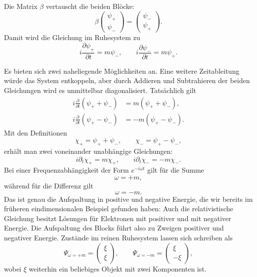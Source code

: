 Die Matrix \(\beta\) vertauscht die beiden Blöcke:
\begin{equation}
\beta
\begin{pmatrix}
\psi_+\\
\psi_-
\end{pmatrix}
=
\begin{pmatrix}
\psi_-\\
\psi_+
\end{pmatrix}.
\end{equation}
Damit wird die Gleichung im Ruhesystem zu
\begin{equation}
i\frac{\partial\psi_+}{\partial t}=m\psi_-,
\qquad
i\frac{\partial\psi_-}{\partial t}=m\psi_+.
\end{equation}

Es bieten sich zwei naheliegende Möglichkeiten an. Eine weitere Zeitableitung würde das System entkoppeln, aber durch Addieren und Subtrahieren der beiden Gleichungen wird es unmittelbar diagonalisiert. Tatsächlich gilt
\begin{align}
i\frac{\partial}{\partial t}(\psi_++\psi_-)
&=m(\psi_++\psi_-),\\
i\frac{\partial}{\partial t}(\psi_+-\psi_-)
&=-m(\psi_+-\psi_-).
\end{align}
Mit den Definitionen
\begin{equation}
\chi_+=\psi_++\psi_-,
\qquad
\chi_-=\psi_+-\psi_-,
\end{equation}
erhält man zwei voneinander unabhängige Gleichungen:
\begin{equation}
i\partial_t\chi_+=m\chi_+,
\qquad
i\partial_t\chi_-=-m\chi_-.
\end{equation}
Bei einer Frequenzabhängigkeit der Form \(e^{-i\omega t}\) gilt für die Summe
\begin{equation}
\omega=+m,
\end{equation}
während für die Differenz gilt
\begin{equation}
\omega=-m.
\end{equation}
Das ist genau die Aufspaltung in positive und negative Energie, die wir bereits im früheren eindimensionalen Beispiel gefunden haben: Auch die relativistische Gleichung besitzt Lösungen für Elektronen mit positiver und mit negativer Energie. Die Aufspaltung des Blocks führt also zu Zweigen positiver und negativer Energie. Zustände im reinen Ruhesystem lassen sich schreiben als
\begin{equation}
\Psi_{\omega=+m}=
\begin{pmatrix}
\xi\\
\xi
\end{pmatrix},
\qquad
\Psi_{\omega=-m}=
\begin{pmatrix}
\xi\\
-\xi
\end{pmatrix},
\end{equation}
wobei \(\xi\) weiterhin ein beliebiges Objekt mit zwei Komponenten ist.

